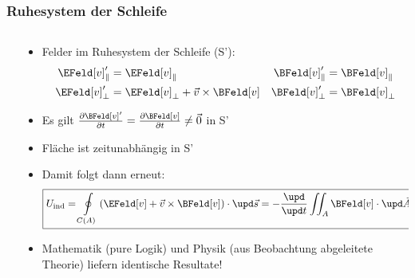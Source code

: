 \begin{frame}
  \frametitle{Ruhesystem der Schleife}
  \begin{columns}
    \begin{column}{.38\textwidth}
  \resizebox{\columnwidth}{!}{}
    \end{column}
    \begin{column}{.62\textwidth}
  \begin{itemize}[<+->]
  \item Felder im Ruhesystem der Schleife (S'):
   \begin{align*}
      \EFeld[v]_\parallel' & = \EFeld[v]_\parallel & \BFeld[v]_\parallel' &= \BFeld[v]_\parallel\\
      \EFeld[v]_\perp' &= \EFeld[v]_\perp + \vec{v} \times \BFeld[v] & \BFeld[v]_\perp'  & = \BFeld[v]_\perp  
      \end{align*}
    \item Es gilt $\frac{\partial \BFeld[v]'}{\partial t} = \frac{\partial \BFeld[v]}{\partial t} \ne \vec{0}$ in S'
    \item Fläche ist zeitunabhängig in S'
  \item Damit folgt dann \alert{erneut}:
    $$
   \boxed{U_\text{ind} = \oint\displaylimits_{C(A)} \left( \EFeld[v] + \vec{v} \times \BFeld[v]\right) \cdot\upd\vec{s} = - \frac{\upd}{\upd t}  \iint_{A} \BFeld[v] \cdot \upd\vec{A}  = -\dot{\Phi}}
    $$
  \item Mathematik (pure Logik) und Physik (aus Beobachtung abgeleitete Theorie) liefern \alert{identische Resultate}!
    
  \end{itemize}
      \end{column}
    \end{columns}
\end{frame}




   
